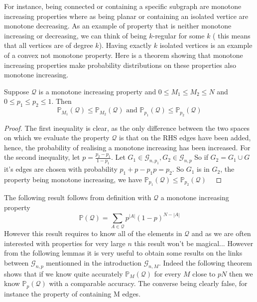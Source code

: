 For instance, being connected or containing a specific subgraph are monotone increasing properties where as being planar or containing an isolated vertice are monotone decreasing. 
As an example of property that is neither monotone increasing or decreasing, we can think of being $k$-regular for some $k$ ( this means that all vertices are of degree $k$).
Having exactly $k$ isolated vertices is an example of a convex not monotone property.
\newline
Here is a theorem showing that monotone increasing properties make probability distributions on these properties also monotone increasing.
\begin{theorem}
	Suppose $\mathcal{Q}$ is a monotone increasing property and $0 \leq M_1 \leq M_2 \leq N$ and $0 \leq p_1 \leq p_2 \leq 1$.
	\newline
	Then
	$$\mathbb{P}_{M_1}(\mathcal{Q}) \leq  \mathbb{P}_{M_2}(\mathcal{Q}) \text{  and  } \mathbb{P}_{p_1}(\mathcal{Q}) \leq \mathbb{P}_{p_2}(\mathcal{Q})$$
\end{theorem}
\begin{proof}
	The first inequality is clear, as the only difference between the two spaces on which we evaluate the property $\mathcal{Q}$ is that on the RHS edges have been added, hence, the probability of realising a monotone increasing has been increased.
	\newline
	For the second inequality, let $p = \frac{p_2 - p_1}{1 - p_1}$. Let $G_1 \in \mathcal{G}_{n, p_1}, G_2 \in \mathcal{G}_{n, p}$
	\newline
	So if $G_2 = G_1 \cup G$ it's edges are chosen with probability $p_1 + p - p_1 p = p_2$. So $G_1$ is in $G_2$, the property being monotone increasing, we have $ \mathbb{P}_{p_1}(\mathcal{Q}) \leq \mathbb{P}_{p_2}(\mathcal{Q})$
\
\end{proof}
The following result follows from definition with $\mathcal{Q}$ a monotone increasing property
\begin{equation}
	\mathbb{P}(\mathcal{Q}) = \sum_{A \in \mathcal{Q}} p^{|A|}(1-p)^{N-|A|}
\end{equation}
However this result requires to know all of the elements in $\mathcal{Q}$ and as we are often interested with properties for very large $n$ this result won't be magical... However from the following lemmas it is very useful to obtain some results on the links between $\mathcal{G}_{n, p}$ mentionned in the introduction $\mathcal{G}_{n, M}$.
Indeed the following theorem shows that if we know quite accurately $\mathbb{P}_M(\mathcal{Q})$ for every $M$ close to $pN$ then we know $\mathbb{P}_p(\mathcal{Q})$ with a comparable accuracy. The converse being clearly false, for instance the property of containing M edges.


